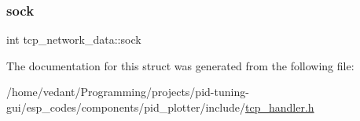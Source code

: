 \mbox{\label{structtcp__network__data_a78063825cce60cb5f121e2c87ccb6dbb}} 
\subsubsection{\texorpdfstring{sock}{sock}}
{\footnotesize\ttfamily int tcp\+\_\+network\+\_\+data\+::sock}



The documentation for this struct was generated from the following file\+:\begin{DoxyCompactItemize}
\item 
/home/vedant/\+Programming/projects/pid-\/tuning-\/gui/esp\+\_\+codes/components/pid\+\_\+plotter/include/\hyperlink{tcp__handler_8h}{tcp\+\_\+handler.\+h}\end{DoxyCompactItemize}
